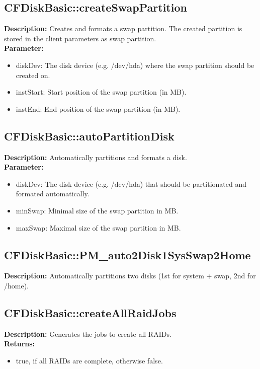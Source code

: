 \subsection{CFDiskBasic::createSwapPartition}
\textbf{Description:} Creates and formats a swap partition. The created partition is stored in the client parameters as swap partition.\\
\textbf{Parameter:}
\begin{itemize}
\item diskDev: The disk device (e.g. /dev/hda) where the swap partition should be created on.
\item instStart: Start position of the swap partition (in MB).
\item instEnd: End position of the swap partition (in MB).
\end{itemize}

\subsection{CFDiskBasic::autoPartitionDisk}
\textbf{Description:} Automatically partitions and formats a disk.\\
\textbf{Parameter:}
\begin{itemize}
\item diskDev: The disk device (e.g. /dev/hda) that should be partitionated and formated automatically.
\item minSwap: Minimal size of the swap partition in MB.
\item maxSwap: Maximal size of the swap partition in MB.
\end{itemize}

\subsection{CFDiskBasic::PM\_auto2Disk1SysSwap2Home}
\textbf{Description:} Automatically partitions two disks (1st for system + swap, 2nd for /home).\\

\subsection{CFDiskBasic::createAllRaidJobs}
\textbf{Description:} Generates the jobs to create all RAIDs.\\
\textbf{Returns:}
\begin{itemize}
\item true, if all RAIDs are complete, otherwise false.
\end{itemize}

